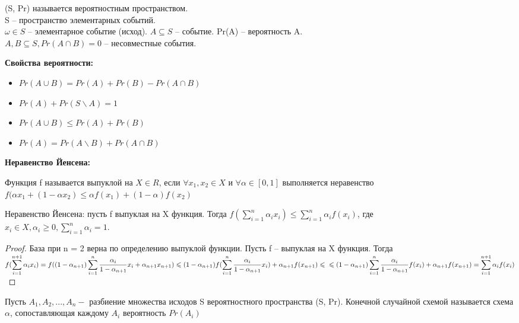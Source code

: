 	\begin{Def} 
		(S, Pr) называется вероятностным пространством.\\ 
		S -- пространство элементарных событий.\\
		$\omega \in S$ -- элементарное событие (исход). $A \subseteq S$ -- событие. 
		Pr(A) -- вероятность A.\\
		$A, B \subseteq S, Pr (A \cap B) = 0$ -- несовместные события.
	\end{Def} 
	
	\textbf{Свойства вероятности:} 
	\begin{itemize}
		\item $Pr(A \cup B) = Pr(A) + Pr(B) - Pr (A \cap B)$
		\item $Pr(A) + Pr(S \backslash A) = 1$
		\item $Pr(A \cup B) \leqslant Pr(A) + Pr(B)$
		\item $Pr(A) = Pr(A \backslash B) + Pr(A \cap B)$
	\end{itemize}
	
	\textbf{Неравенство Йенсена:}

	\begin{Def} 
		Функция f называется выпуклой на $X \in R$, если $\forall x_1, x_2 \in X$ и $\forall \alpha \in [0,1]$ выполняется неравенство $f(\alpha x_1 + (1 - \alpha x_2) \leqslant \alpha f(x_1) + (1-\alpha)f(x_2)$
	\end{Def} 

	Неравенство Йенсена: пусть f выпуклая на X функция. Тогда $\displaystyle f(\sum_{i=1}^{n} \alpha_i x_i) \leqslant \sum_{i=1}^{n} \alpha_i f(x_i)$, где\\ $\displaystyle x_i \in X, \alpha_i \geqslant 0, \sum_{i=1}^{n} \alpha_i = 1$. 

	\begin{proof}
		База при n = 2 верна по определению выпуклой функции. Пусть f -- выпуклая на X функция. Тогда\\ 
		$\displaystyle f(\sum_{i=1}^{n+1} \alpha_i x_i) = f((1-\alpha_{n+1})\sum_{i=1}^{n} \frac{\alpha_i}{1-\alpha_{n+1}}x_i + \alpha_{n+1} x_{n+1}) \leqslant (1 - \alpha_{n+1}) f(\sum_{i=1}^{n} \frac{\alpha_i}{1-\alpha_{n+1}}x_i) + \alpha_{n+1} f(x_{n+1}) \leqslant \\
		\leqslant (1 - \alpha_{n+1}) \sum_{i=1}^{n} \frac{\alpha_i}{1-\alpha_{n+1}} f(x_i) + \alpha_{n+1} f(x_{n+1}) = \sum_{i=1}^{n+1} \alpha_i f(x_i)$
	\end{proof}

	\begin{Def} 
		Пусть $A_1, A_2, ..., A_n -$ разбиение множества исходов S вероятностного пространства (S, Pr). Конечной случайной схемой называется схема $\alpha$, сопоставляющая каждому $A_i$ вероятность $Pr(A_i)$
	\end{Def} 

